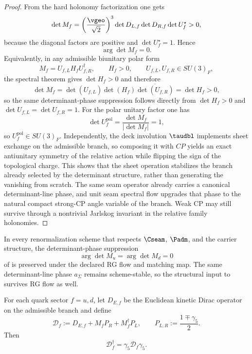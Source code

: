 \begin{proof}
From the hard holonomy factorization one gets
\[
\det M_f
=
\left(\frac{\vgeo}{\sqrt2}\right)^3
\det D_{L,f}\det D_{R,f}\det U_f^\star
>
0,
\]
because the diagonal factors are positive and $\det U_f^\star=1$. Hence
\[
\arg\det M_f=0.
\]
Equivalently, in any admissible biunitary polar form
\[
M_f=U_{f,L}H_fU_{f,R}^\dagger,
\qquad
H_f>0,
\qquad
U_{f,L},U_{f,R}\in SU(3)_F,
\]
the spectral theorem gives $\det H_f>0$ and therefore
\[
\det M_f=\det(U_{f,L})\det(H_f)\overline{\det(U_{f,R})}=\det H_f>0,
\]
so the same determinant-phase suppression follows directly from $\det H_f>0$ and
$\det U_{f,L}=\det U_{f,R}=1$.
For the polar unitary factor one has
\[
\det U_f^{\mathrm{pol}}
=
\frac{\det M_f}{|\det M_f|}
=
1,
\]
so $U_f^{\mathrm{pol}}\in SU(3)_F$. Independently, the deck involution $\taudbl$
implements sheet exchange on the admissible branch, so composing it with $CP$ yields an exact
antiunitary symmetry of the relative action while flipping the sign of the topological charge.
This shows that the sheet operation stabilizes the branch already selected by the determinant
structure, rather than generating the vanishing from scratch. The same seam operator already
carries a canonical determinant-line phase, and unit seam spectral flow upgrades that phase to the
natural compact strong-CP angle variable of the branch. Weak CP may still survive through a
nontrivial Jarlskog invariant in the relative family holonomies.
\end{proof}

\begin{corollary}
\label{cor:strong-cp-rg-stability}
In every renormalization scheme that respects $\Cseam$, $\Padm$, and the carrier structure, the
determinant-phase suppression
\[
\arg\det M_u=\arg\det M_d=0
\]
of  is preserved under the declared RG flow and matching map.
The same determinant-line phase $a_\Sigma$ remains scheme-stable, so the structural input to
 survives RG flow as well.
\end{corollary}

\begin{lemma}
\label{lem:retained-gamma5-hermiticity}
For each quark sector $f=u,d$, let $D_{E,f}$ be the Euclidean kinetic Dirac operator on the
admissible branch and define
\[
\mathcal D_f:=D_{E,f}+M_fP_R+M_f^\dagger P_L,
\qquad
P_{L,R}:=\frac{1\mp\gamma_5}{2}.
\]
Then
\[
\mathcal D_f^\dagger=\gamma_5\mathcal D_f\gamma_5.
\]
\end{lemma}

